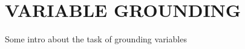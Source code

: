 \chapter{VARIABLE GROUNDING\label{chapter:grounding}}

Some intro about the task of grounding variables
